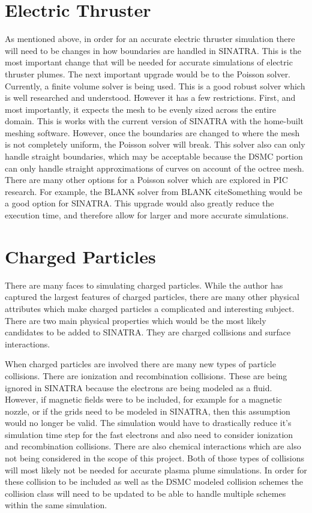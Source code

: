 \section{Electric Thruster}

As mentioned above, in order for an accurate electric thruster simulation there will need to be changes in how boundaries are handled in SINATRA. This is the most important change that will be needed for accurate simulations of electric thruster plumes. The next important upgrade would be to the Poisson solver. Currently, a finite volume solver is being used. This is a good robust solver which is well researched and understood. However it has a few restrictions. First, and most importantly, it expects the mesh to be evenly sized across the entire domain. This is works with the current version of SINATRA with the home-built meshing software. However, once the boundaries are changed to where the mesh is not completely uniform, the Poisson solver will break. This solver also can only handle straight boundaries, which may be acceptable because the DSMC portion can only handle straight approximations of curves on account of the octree mesh. There are many other options for a Poisson solver which are explored in PIC research. For example, the BLANK solver from BLANK cite{Something} would be a good option for SINATRA. This upgrade would also greatly reduce the execution time, and therefore allow for larger and more accurate simulations. \par


\section{Charged Particles}

There are many faces to simulating charged particles. While the author has captured the largest features of charged particles, there are many other physical attributes which make charged particles a complicated and interesting subject. There are two main physical properties which would be the most likely candidates to be added to SINATRA. They are charged collisions and surface interactions. \par

\indent When charged particles are involved there are many new types of particle collisions. There are ionization and recombination collisions. These are being ignored in SINATRA because the electrons are being modeled as a fluid. However, if magnetic fields were to be included, for example for a magnetic nozzle, or if the grids need to be modeled in SINATRA, then this assumption would no longer be valid. The simulation would have to drastically reduce it's simulation time step for the fast electrons and also need to consider ionization and recombination collisions. There are also chemical interactions which are also not being considered in the scope of this project. Both of those types of collisions will most likely not be needed for accurate plasma plume simulations. In order for these collision to be included as well as the DSMC modeled collision schemes the collision class will need to be updated to be able to handle multiple schemes within the same simulation. \par

